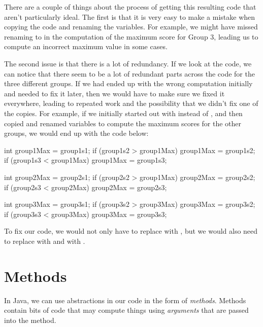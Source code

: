 \noindent There are a couple of things about the process of getting this resulting code
that aren't particularly ideal.
The first is that it is very easy to make a mistake when copying the code and renaming
the variables. For example, we might have missed renaming  to 
in the computation of the maximum score for Group 3, leading us to compute an incorrect maximum
value in some cases.

The second issue is that there is a lot of redundancy.
If we look at the code, we can notice that there seem to be a lot of redundant parts
across the code for the three different groups.
If we had ended up with the wrong computation initially and needed to fix it
later, then we would have to make sure we fixed it everywhere, leading to repeated work and the
possibility that we didn't fix one of the copies. For example, if we initially started out with
 instead of , and then copied and renamed variables
to compute the maximum scores for the other groups, we would end up with the code below:

\begin{code}
int group1Max = group1s1;
if (group1s2 > group1Max) {
  group1Max = group1s2;
}
if (group1s3 < group1Max) {
  group1Max = group1s3;
}

int group2Max = group2s1;
if (group2s2 > group1Max) {
  group2Max = group2s2;
}
if (group2s3 < group2Max) {
  group2Max = group2s3;
}

int group3Max = group3s1;
if (group3s2 > group3Max) {
  group3Max = group3s2;
}
if (group3s3 < group3Max) {
  group3Max = group3s3;
}
\end{code}

To fix our code, we would not only have to replace  with
, but we would also need to replace  with
 and  with .

\section{Methods}
In Java, we can use abstractions in our code in the form of \emph{methods}.
Methods contain bits of code that may compute things using \emph{arguments}
that are passed into the method.

